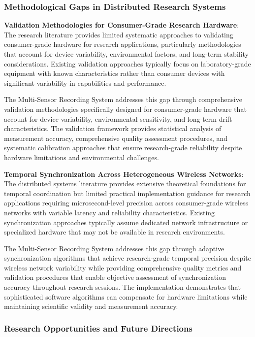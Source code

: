 \documentclass[11pt,a4paper]{article}
\begin{document}
\subsubsection{Methodological Gaps in Distributed Research Systems}

\textbf{Validation Methodologies for Consumer-Grade Research Hardware}: The research literature provides limited systematic
approaches to validating consumer-grade hardware for research applications, particularly methodologies that account for
device variability, environmental factors, and long-term stability considerations. Existing validation approaches
typically focus on laboratory-grade equipment with known characteristics rather than consumer devices with significant
variability in capabilities and performance.

The Multi-Sensor Recording System addresses this gap through comprehensive validation methodologies specifically
designed for consumer-grade hardware that account for device variability, environmental sensitivity, and long-term drift
characteristics. The validation framework provides statistical analysis of measurement accuracy, comprehensive quality
assessment procedures, and systematic calibration approaches that ensure research-grade reliability despite hardware
limitations and environmental challenges.

\textbf{Temporal Synchronization Across Heterogeneous Wireless Networks}: The distributed systems literature provides
extensive theoretical foundations for temporal coordination but limited practical implementation guidance for research
applications requiring microsecond-level precision across consumer-grade wireless networks with variable latency and
reliability characteristics. Existing synchronization approaches typically assume dedicated network infrastructure or
specialized hardware that may not be available in research environments.

The Multi-Sensor Recording System addresses this gap through adaptive synchronization algorithms that achieve
research-grade temporal precision despite wireless network variability while providing comprehensive quality metrics and
validation procedures that enable objective assessment of synchronization accuracy throughout research sessions. The
implementation demonstrates that sophisticated software algorithms can compensate for hardware limitations while
maintaining scientific validity and measurement accuracy.

\subsubsection{Research Opportunities and Future Directions}
\end{document}
